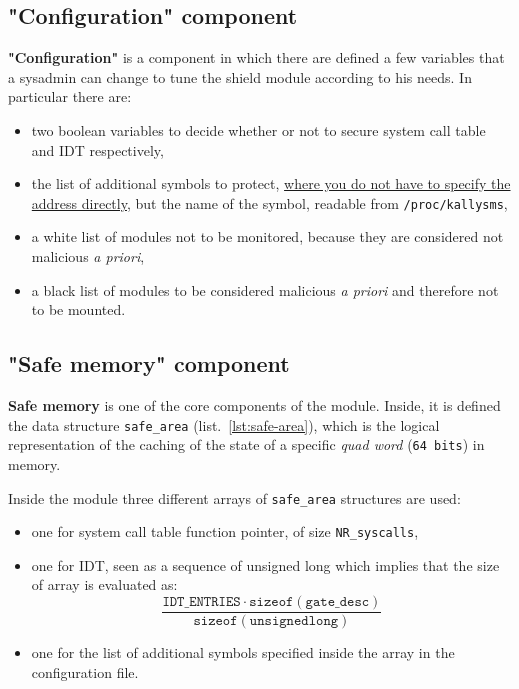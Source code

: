 \documentclass{article}
\begin{document}
	\subsection{"Configuration" component}\label{sec:config}
	\textbf{"Configuration"} is a component in which there are defined a few variables that a sysadmin can change to
	tune the shield module according to his needs. In particular there are:
	\begin{itemize}
		\item two boolean variables to decide whether or not to secure system call table and IDT respectively,
		\item the list of additional symbols to protect, \ul{where you do not have to specify the address directly},
		but the name of the symbol, readable from \texttt{/proc/kallysms},
		\item a white list of modules not to be monitored, because they are considered not malicious \textit{a priori},
		\item a black list of modules to be considered malicious \textit{a priori} and therefore not to be mounted.
	\end{itemize}

	\subsection{"Safe memory" component}
	\textbf{Safe memory} is one of the core components of the module. Inside, it is defined the data structure
	\texttt{safe\_area} (list.~\ref{lst:safe-area}), which is the logical representation of the caching of the state of
	a specific \textit{quad word} (\texttt{64 bits}) in memory.

	Inside the module three different arrays of \texttt{safe\_area} structures are used:
	\begin{itemize}
		\item one for system call table function pointer, of size \texttt{NR\_syscalls},
		\item one for IDT, seen as a sequence of unsigned long which implies that the size of array is evaluated as:
		\begin{equation*}
			\dfrac{\mathtt{IDT\_ENTRIES} \cdot \mathtt{sizeof(gate\_desc)}}{\mathtt{sizeof(unsigned long)}}
		\end{equation*}
		\item one for the list of additional symbols specified inside the array in the configuration file.
	\end{itemize}
\end{document}
